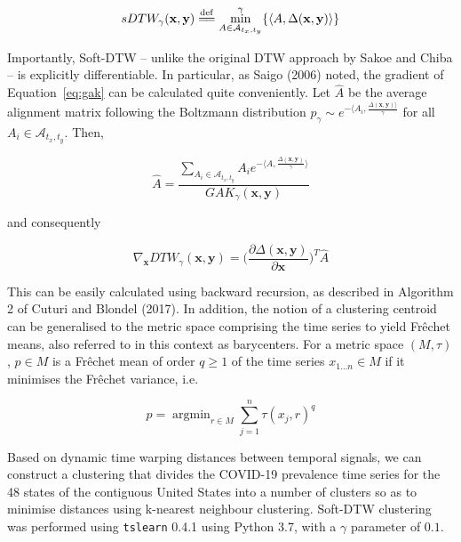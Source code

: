 \documentclass{article}
\newcommand{\eqdef}{\overset{\mathrm{def}}{=\joinrel=}}
\begin{document}
\begin{equation}
	sDTW_{\gamma}(\mathbf{x}, \mathbf{y}) \eqdef \min_{A \in \mathcal{A}_{t_x, t_y}} ^{\gamma} \{ \langle A, \Delta(\mathbf{x}, \mathbf{y}) \rangle \}
\end{equation}

Importantly, Soft-DTW -- unlike the original DTW approach by Sakoe and Chiba\cite{sakoe1978dynamic} -- is explicitly differentiable. In particular, as Saigo (2006) noted,\cite{saigo2006optimizing} the gradient of 
 Equation~\eqref{eq:gak} can be calculated quite conveniently. Let $\hat{A}$ be the average alignment matrix following the Boltzmann distribution $p_{\gamma} \sim e^{- \langle A_i, \frac{\Delta(\mathbf{x}, \mathbf{y}) \rangle}{\gamma}}$ for all $A_i \in \mathcal{A}_{t_x, t_y}$. Then, 
 
\begin{equation}
 	\hat{A} = \frac{\displaystyle \sum_{A_i \in \mathcal{A}_{t_x, t_y}} A_i e^{- \langle A, \frac{\Delta(\mathbf{x}, \mathbf{y})}{\gamma}\rangle}}{GAK_{\gamma}(\mathbf{x}, \mathbf{y})}
 \end{equation}

\noindent and consequently

\begin{equation}
	\nabla_{\mathbf{x}} DTW_{\gamma} (\mathbf{x}, \mathbf{y}) = \Bigg( \frac{\partial \Delta(\mathbf{x}, \mathbf{y})}{\partial \mathbf{x}} \Bigg)^T \hat{A}
\end{equation}

This can be easily calculated using backward recursion, as described in Algorithm 2 of Cuturi and Blondel (2017).\cite{cuturi2017soft} In addition, the notion of a clustering centroid can be generalised to the metric space comprising the time series to yield Fr\^{e}chet means, also referred to in this context as barycenters. For a metric space $(M, \tau)$, $p \in M$ is a Fr\^{e}chet mean of order $q \geq 1$ of the time series $x_{1 \ldots n} \in M$ if it minimises the Fr\^{e}chet variance, i.e.

\begin{equation}
	p = \mathop{arg min}_{r \in M} \sum_{j = 1}^n \tau(x_j, r)^q
\end{equation}

Based on dynamic time warping distances between temporal signals, we can construct a clustering that divides the COVID-19 prevalence time series for the 48 states of the contiguous United States into a number of clusters so as to minimise distances using k-nearest neighbour clustering. Soft-DTW clustering was performed using \texttt{tslearn} 0.4.1\cite{JMLR:v21:20-091} using Python 3.7, with a $\gamma$ parameter of $0.1$.
\end{document}
